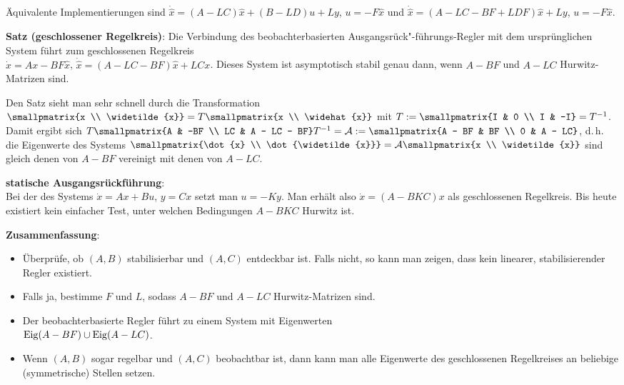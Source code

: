 Äquivalente Implementierungen sind
$\dot{\widehat{x}} = (A - LC) \widehat{x} + (B - LD)u + Ly$, $u = -F\widehat{x}$ und
$\dot{\widehat{x}} = (A - LC - BF + LDF) \widehat{x} + Ly$, $u = -F\widehat{x}$.

\textbf{Satz (geschlossener Regelkreis)}:
Die Verbindung des beobachterbasierten Ausgangsrück"-führungs-Regler mit dem ursprünglichen
System führt zum geschlossenen Regelkreis\\
$\dot{x}  = Ax - BF\widehat{x}$,
$\dot{\widehat{x}} = (A - LC - BF) \widehat{x} + LCx$.
Dieses System ist asymptotisch stabil genau dann, wenn $A - BF$ und $A - LC$ Hurwitz-Matrizen sind.

Den Satz sieht man sehr schnell durch die Transformation
$\smallpmatrix{x \\ \widetilde{x}} = T \smallpmatrix{x \\ \widehat{x}}$ mit
$T := \smallpmatrix{I & 0 \\ I & -I} = T^{-1}$.
Damit ergibt sich $T \smallpmatrix{A & -BF \\ LC & A - LC - BF} T^{-1} = \A
:= \smallpmatrix{A - BF & BF \\ 0 & A - LC}$, d.\,h. die Eigenwerte des Systems
$\smallpmatrix{\dot{x} \\ \dot{\widetilde{x}}} = \A \smallpmatrix{x \\ \widetilde{x}}$
sind gleich denen von $A - BF$ vereinigt mit denen von $A - LC$.

\linie

\textbf{statische Ausgangsrückführung}:\\
Bei der  des Systems
$\dot{x} = Ax + Bu$, $y = Cx$ setzt man $u = -Ky$.
Man erhält also $\dot{x} = (A - BKC)x$ als geschlossenen Regelkreis.
Bis heute existiert kein einfacher Test,
unter welchen Bedingungen $A - BKC$ Hurwitz ist.

\linie

\textbf{Zusammenfassung}:
\begin{itemize}
    \item
    Überprüfe, ob $(A, B)$ stabilisierbar und $(A, C)$ entdeckbar ist.
    Falls nicht, so kann man zeigen, dass kein linearer, stabilisierender Regler existiert.

    \item
    Falls ja, bestimme $F$ und $L$, sodass $A - BF$ und $A - LC$ Hurwitz-Matrizen sind.

    \item
    Der beobachterbasierte Regler führt zu einem System mit Eigenwerten\\
    $\operatorname{Eig}(A - BF) \cup \operatorname{Eig}(A - LC)$.

    \item
    Wenn $(A, B)$ sogar regelbar und $(A, C)$ beobachtbar ist, dann kann man alle Eigenwerte
    des geschlossenen Regelkreises an beliebige (symmetrische) Stellen setzen.
\end{itemize}

